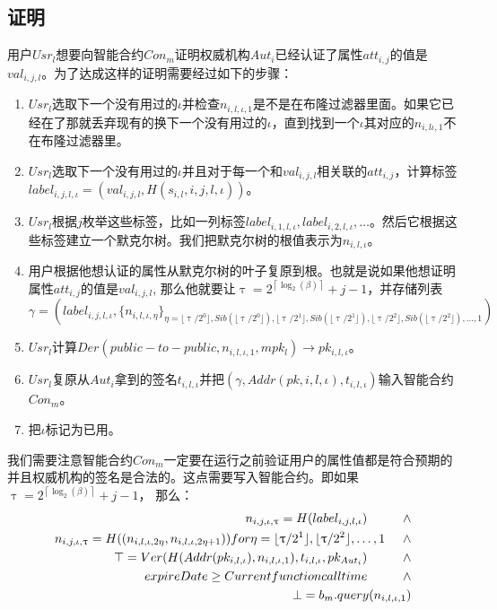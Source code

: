\documentclass[UTF8]{ctexart}
\def\lc{\left\lceil}
\def\rc{\right\rceil}
\begin{document}
\subsection{证明}
用户$Usr_l$想要向智能合约$Con_m$证明权威机构$Aut_i$已经认证了属性$att_{i, j}$的值是$val_{i, j, l}$。为了达成这样的证明需要经过如下的步骤：
\begin{enumerate}
\item $Usr_l$选取下一个没有用过的$\iota$并检查$n_{i, l, \iota, 1}$是不是在布隆过滤器里面。如果它已经在了那就丢弃现有的换下一个没有用过的$\iota$，直到找到一个$\iota$其对应的$n_{i, l \iota, 1}$不在布隆过滤器里。
\item $Usr_l$选取下一个没有用过的$\iota$并且对于每一个和$val_{i, j, l}$相关联的$att_{i, j}$，计算标签$label_{i, j, l, \iota} = (val_{i, j, l}, H(s_{i, l}, i, j, l, \iota))$。
\item $Usr_l$根据$j$枚举这些标签，比如一列标签$label_{i, 1, l, \iota}, label_{i, 2, l, \iota}, \ldots$。然后它根据这些标签建立一个默克尔树。我们把默克尔树的根值表示为$n_{i, l, \iota}$。
\item 用户根据他想认证的属性从默克尔树的叶子复原到根。也就是说如果他想证明属性$att_{i, j}$的值是$val_{i, j, l}$, 那么他就要让$\uptau = 2^{\lc\log_2(\beta)\rc} + j - 1$，并存储列表$\gamma = (label_{i, j, l, \iota}, \{n_{i, l, \iota, \eta}\}_{\eta = \lfloor\uptau/2^0\rfloor, Sib( \lfloor\uptau/2^0\rfloor),  \lfloor\uptau/2^1\rfloor, Sib(\lfloor\uptau/2^1\rfloor), \lfloor\uptau/2^2\rfloor, Sib(\lfloor\uptau/2^2\rfloor), \ldots, 1})$
\item $Usr_l$计算$Der(public-to-public, n_{i, l, \iota, 1}, mpk_l) \to pk_{i, l, \iota}$。
\item $Usr_l$复原从$Aut_i$拿到的签名$t_{i, l, \iota}$并把$(\gamma, Addr(pk, i, l, \iota), t_{i, l , \iota})$输入智能合约$Con_m$。
\item 把$\iota$标记为已用。
\end{enumerate}
我们需要注意智能合约$Con_m$一定要在运行之前验证用户的属性值都是符合预期的并且权威机构的签名是合法的。这点需要写入智能合约。即如果$\uptau = 2^{\lc\log_2(\beta)\rc} + j - 1$， 那么：
\begin{align*}
n_{i, j, \iota, \uptau} = H(label_{i, j, l, \iota})  \hspace{1cm} \wedge \\
n_{i, j, \iota, \uptau} = H((n_{i, l, \iota, 2\eta}, n_{i, l, \iota, 2\eta + 1})) for \eta = \lfloor\uptau/2^1\rfloor, \lfloor\uptau/2^2\rfloor, \ldots, 1 \hspace{0.5cm} \wedge \\
\top = Ver(H(Addr(pk_{i, l, \iota}), n_{i, l, \iota, 1}), t_{i, l, \iota}, pk_{Aut_i}) \hspace{1cm} \wedge \\
expireDate \ge Current function call time \hspace{1cm} \wedge \\
\bot = b_{m}.query(n_{i, l, \iota, 1})
\end{align*}
\end{document}

